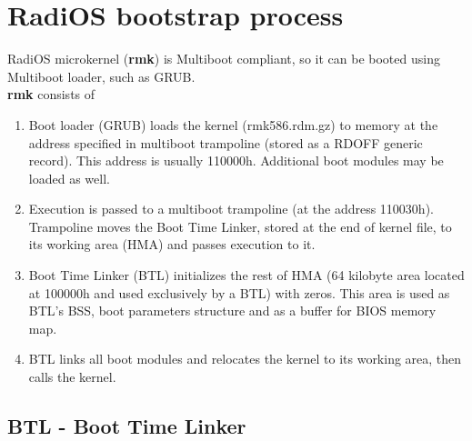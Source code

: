 
\section{RadiOS bootstrap process}

RadiOS microkernel (\textbf{rmk}) is Multiboot compliant, so it can be booted
using Multiboot loader, such as GRUB.
\\
\textbf{rmk} consists of

\begin{enumerate}
\item Boot loader (GRUB) loads the kernel (rmk586.rdm.gz) to memory at
      the address specified in multiboot trampoline (stored as a RDOFF
      generic record). This address is usually 110000h. Additional boot
      modules may be loaded as well.
\item Execution is passed to a multiboot trampoline (at the address 110030h).
      Trampoline moves the Boot Time Linker, stored at the end of kernel
      file, to its working area (HMA) and passes execution to it.
\item Boot Time Linker (BTL) initializes the rest of HMA (64 kilobyte area
      located at 100000h and used exclusively by a BTL) with zeros. This
      area is used as BTL's BSS, boot parameters structure and as a buffer
      for BIOS memory map.
\item BTL links all boot modules and relocates the kernel to its working area,
      then calls the kernel.
\end{enumerate}


\subsection{BTL - Boot Time Linker}
